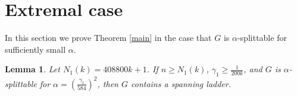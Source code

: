 \documentclass[oneside,12pt]{memoir}
\newtheorem{lemma}[theorem]{Lemma}
\newcommand{\g}{\gamma}
\begin{document}
\section{Extremal case}

In this section we prove Theorem \ref{main} in the case that $G$ is $\alpha$-splittable for sufficiently small $\alpha$.

\begin{lemma}\label{ext}
Let $N_1(k)=408800k+1$. If $n\geq N_1(k)$, $\g_1\geq \frac{1}{200k}$, and $G$ is $\alpha$-splittable for $\alpha=\left(\frac{\g_1}{584}\right)^2$, then $G$ contains a spanning ladder.
\end{lemma}
\end{document}
